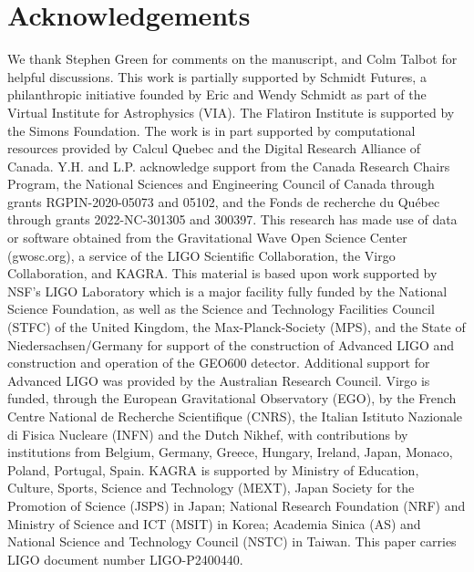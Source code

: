 \documentclass[twocolumn]{aastex631}
\begin{document}
\section*{Acknowledgements}
We thank Stephen Green for comments on the manuscript, and Colm Talbot for helpful discussions.
This work is partially supported by Schmidt Futures, a philanthropic initiative founded by Eric and Wendy Schmidt as part of the Virtual Institute for Astrophysics (VIA). The Flatiron Institute is supported by the Simons Foundation. The work is in part supported by computational resources provided by Calcul Quebec and the Digital Research Alliance of Canada. Y.H. and L.P. acknowledge support from the Canada Research Chairs Program, the National Sciences and Engineering Council of Canada through grants RGPIN-2020-05073 and 05102, and the Fonds de recherche du Québec through grants 2022-NC-301305 and 300397.
This research has made use of data or software obtained from the Gravitational Wave Open Science Center (gwosc.org), a service of the LIGO Scientific Collaboration, the Virgo Collaboration, and KAGRA. This material is based upon work supported by NSF's LIGO Laboratory which is a major facility fully funded by the National Science Foundation, as well as the Science and Technology Facilities Council (STFC) of the United Kingdom, the Max-Planck-Society (MPS), and the State of Niedersachsen/Germany for support of the construction of Advanced LIGO and construction and operation of the GEO600 detector. Additional support for Advanced LIGO was provided by the Australian Research Council. Virgo is funded, through the European Gravitational Observatory (EGO), by the French Centre National de Recherche Scientifique (CNRS), the Italian Istituto Nazionale di Fisica Nucleare (INFN) and the Dutch Nikhef, with contributions by institutions from Belgium, Germany, Greece, Hungary, Ireland, Japan, Monaco, Poland, Portugal, Spain. KAGRA is supported by Ministry of Education, Culture, Sports, Science and Technology (MEXT), Japan Society for the Promotion of Science (JSPS) in Japan; National Research Foundation (NRF) and Ministry of Science and ICT (MSIT) in Korea; Academia Sinica (AS) and National Science and Technology Council (NSTC) in Taiwan.
This paper carries LIGO document number LIGO-P2400440.








\end{document}
